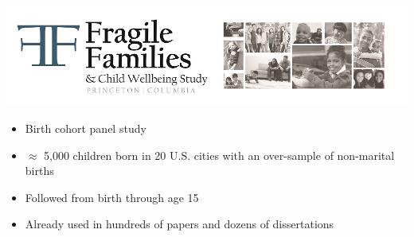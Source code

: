 \documentclass[aspectratio=169]{beamer}
\begin{document}
\begin{frame}

\begin{center}
\includegraphics[width=\textwidth]{figures/ff_logo}
\end{center}

\begin{itemize}
\item Birth cohort panel study
\item $\approx$ 5,000 children born in 20 U.S. cities with an over-sample of non-marital births
\item Followed from birth through age 15
\item Already used in hundreds of papers and dozens of dissertations
\end{itemize}

\end{frame}
\begin{frame}

\begin{center}
\end{center}

\end{frame}
\end{document}
